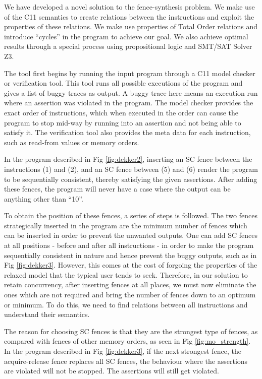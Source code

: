 We have developed a novel solution to the fence-synthesis problem. We make use of the C11 semantics to create relations between the instructions and exploit the properties of these relations. We make use properties of Total Order relations and introduce ``cycles'' in the program to achieve our goal. We also achieve optimal results through a special process using propositional logic and SMT/SAT Solver Z3.

The tool first begins by running the input program through a C11 model checker or verification tool. This tool runs all possible executions of the program and gives a list of buggy traces as output. A buggy trace here means an execution run where an assertion was violated in the program. The model checker provides the exact order of instructions, which when executed in the order can cause the program to stop mid-way by running into an assertion and not being able to satisfy it. The verification tool also provides the meta data for each instruction, such as read-from values or memory orders.

In the program described in Fig \ref{fig:dekker2}, inserting an SC fence between the instructions (1) and (2), and an SC fence between (5) and (6) render the program to be sequentially consistent, thereby satisfying the given assertions. After adding these fences, the program will never have a case where the output can be anything other than ``10''.

To obtain the position of these fences, a series of steps is followed. The two fences strategically inserted in the program are the minimum number of fences which can be inserted in order to prevent the unwanted outputs. One can add SC fences at all positions - before and after all instructions - in order to make the program sequentially consistent in nature and hence prevent the buggy outputs, such as in Fig \ref{fig:dekker3}. However, this comes at the cost of forgoing the properties of the relaxed model that the typical user tends to seek. Therefore, in our solution to retain concurrency, after inserting fences at all places, we must now eliminate the ones which are not required and bring the number of fences down to an optimum or minimum. To do this, we need to find relations between all instructions and understand their semantics.

The reason for choosing SC fences is that they are the strongest type of fences, as compared with fences of other memory orders, as seen in Fig \ref{fig:mo_strength}. In the program described in Fig \ref{fig:dekker3}, if the next strongest fence, the acquire-release fence replaces all SC fences, the behaviour where the assertions are violated will not be stopped. The assertions will still get violated.

